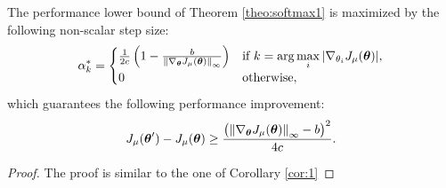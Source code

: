 \begin{corollary}
The performance lower bound of Theorem \ref{theo:softmax1} is maximized by the following non-scalar step size:
\[ \alpha_{k}^*=	
\begin{cases}
	\frac{1}
		{2c}\left(1-\frac{b}{\norm[\infty]{\gradJ{\vtheta}}}\right) & 
		\text{if } k = \arg\max\limits_i |\gradJ{\theta_i}|,	\\
		0 & \text{otherwise},
\end{cases}
\]
which guarantees the following performance improvement: 
\[
\DeltaJ \geq \frac{\left(\norm[\infty]{\gradJ{\vtheta}} - b\right)^2}{4c}.
\]
\end{corollary}
\begin{proof}
The proof is similar to the one of Corollary \ref{cor:1}
\end{proof}